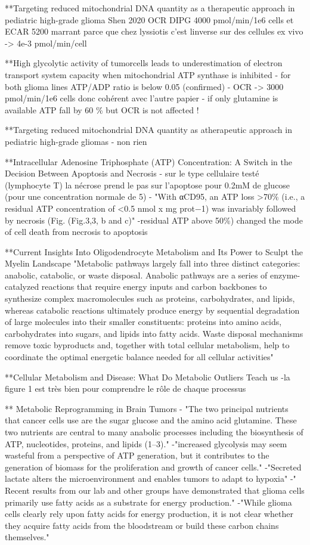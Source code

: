 \documentclass[11pt,a4paper]{article}
\begin{document}
**Targeting reduced mitochondrial DNA quantity as a therapeutic approach in pediatric high-grade glioma Shen 2020
OCR DIPG 4000 pmol/min/1e6 cells et ECAR 5200 marrant parce que chez lyssiotis c'est linverse sur des cellules ex vivo -> 4e-3 pmol/min/cell

**High glycolytic activity of tumorcells leads to underestimation of electron transport system capacity when mitochondrial ATP synthase is inhibited
- for both glioma lines ATP/ADP ratio is below 0.05 (confirmed)
- OCR -> 3000 pmol/min/1e6 cells donc cohérent avec l'autre papier
- if only glutamine is available ATP fall by 60 \% but OCR is not affected !


**Targeting reduced mitochondrial DNA quantity as atherapeutic approach in pediatric high-grade gliomas
 - non rien
 
**Intracellular Adenosine Triphosphate (ATP) Concentration: A Switch in the Decision Between Apoptosis and Necrosis
- sur le type cellulaire testé (lymphocyte T) la nécrose prend le pas sur l'apoptose pour 0.2mM de glucose (pour une concentration normale de 5)
- "With αCD95, an ATP loss >70\% (i.e., a residual ATP concentration of <0.5 nmol x mg prot−1) was invariably followed by necrosis (Fig. ​(Fig.3,3, b and c)"
-residual ATP above 50\%) changed the mode of cell
death from necrosis to apoptosis

**Current Insights Into Oligodendrocyte Metabolism and Its Power to Sculpt the Myelin Landscape
"Metabolic pathways largely fall into three distinct categories: anabolic, catabolic, or waste disposal. Anabolic pathways are a series of enzyme-catalyzed reactions that require energy inputs and carbon backbones to synthesize complex macromolecules such as proteins, carbohydrates, and lipids, whereas catabolic reactions ultimately produce energy by sequential degradation of large molecules into their smaller constituents: proteins into amino acids, carbohydrates into sugars, and lipids into fatty acids. Waste disposal mechanisms remove toxic byproducts and, together with total cellular metabolism, help to coordinate the optimal energetic balance needed for all cellular activities"

**Cellular Metabolism and Disease: What Do Metabolic Outliers Teach us
-la figure 1 est très bien pour comprendre le rôle de chaque processus

** Metabolic Reprogramming in Brain Tumors
- "The two principal nutrients that cancer cells use are the sugar glucose and the amino acid glutamine. These two nutrients are central to many anabolic processes including the biosynthesis of ATP, nucleotides, proteins, and lipids (1–3)."
-"increased glycolysis may seem wasteful from a perspective of ATP generation, but it contributes to the generation of biomass for the proliferation and growth of cancer cells."
-"Secreted lactate alters the microenvironment and enables tumors to adapt to hypoxia"
-" Recent results from our lab and other groups have demonstrated that glioma cells primarily use fatty acids as a substrate for energy production."
-"While glioma cells clearly rely upon fatty acids for energy production, it is not clear whether they acquire fatty acids from the bloodstream or build these carbon chains themselves."
\end{document}
